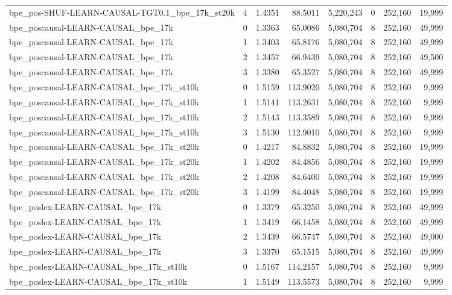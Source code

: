 \begin{tabular}{lrrrrrrr}
bpe\_pos-SHUF-LEARN-CAUSAL-TGT0.1\_bpe\_17k\_st20k & 4 & 1.4351 & 88.5011 & 5,220,243 & 0 & 252,160 & 19,999 \\
bpe\_poscausal-LEARN-CAUSAL\_bpe\_17k & 0 & 1.3363 & 65.0086 & 5,080,704 & 8 & 252,160 & 49,999 \\
bpe\_poscausal-LEARN-CAUSAL\_bpe\_17k & 1 & 1.3403 & 65.8176 & 5,080,704 & 8 & 252,160 & 49,999 \\
bpe\_poscausal-LEARN-CAUSAL\_bpe\_17k & 2 & 1.3457 & 66.9439 & 5,080,704 & 8 & 252,160 & 49,500 \\
bpe\_poscausal-LEARN-CAUSAL\_bpe\_17k & 3 & 1.3380 & 65.3527 & 5,080,704 & 8 & 252,160 & 49,999 \\
bpe\_poscausal-LEARN-CAUSAL\_bpe\_17k\_st10k & 0 & 1.5159 & 113.9020 & 5,080,704 & 8 & 252,160 & 9,999 \\
bpe\_poscausal-LEARN-CAUSAL\_bpe\_17k\_st10k & 1 & 1.5141 & 113.2631 & 5,080,704 & 8 & 252,160 & 9,999 \\
bpe\_poscausal-LEARN-CAUSAL\_bpe\_17k\_st10k & 2 & 1.5143 & 113.3589 & 5,080,704 & 8 & 252,160 & 9,999 \\
bpe\_poscausal-LEARN-CAUSAL\_bpe\_17k\_st10k & 3 & 1.5130 & 112.9010 & 5,080,704 & 8 & 252,160 & 9,999 \\
bpe\_poscausal-LEARN-CAUSAL\_bpe\_17k\_st20k & 0 & 1.4217 & 84.8832 & 5,080,704 & 8 & 252,160 & 19,999 \\
bpe\_poscausal-LEARN-CAUSAL\_bpe\_17k\_st20k & 1 & 1.4202 & 84.4856 & 5,080,704 & 8 & 252,160 & 19,999 \\
bpe\_poscausal-LEARN-CAUSAL\_bpe\_17k\_st20k & 2 & 1.4208 & 84.6400 & 5,080,704 & 8 & 252,160 & 19,999 \\
bpe\_poscausal-LEARN-CAUSAL\_bpe\_17k\_st20k & 3 & 1.4199 & 84.4048 & 5,080,704 & 8 & 252,160 & 19,999 \\
bpe\_poslex-LEARN-CAUSAL\_bpe\_17k & 0 & 1.3379 & 65.3250 & 5,080,704 & 8 & 252,160 & 49,999 \\
bpe\_poslex-LEARN-CAUSAL\_bpe\_17k & 1 & 1.3419 & 66.1458 & 5,080,704 & 8 & 252,160 & 49,999 \\
bpe\_poslex-LEARN-CAUSAL\_bpe\_17k & 2 & 1.3439 & 66.5747 & 5,080,704 & 8 & 252,160 & 49,000 \\
bpe\_poslex-LEARN-CAUSAL\_bpe\_17k & 3 & 1.3370 & 65.1515 & 5,080,704 & 8 & 252,160 & 49,999 \\
bpe\_poslex-LEARN-CAUSAL\_bpe\_17k\_st10k & 0 & 1.5167 & 114.2157 & 5,080,704 & 8 & 252,160 & 9,999 \\
bpe\_poslex-LEARN-CAUSAL\_bpe\_17k\_st10k & 1 & 1.5149 & 113.5573 & 5,080,704 & 8 & 252,160 & 9,999 \\

\end{tabular}
